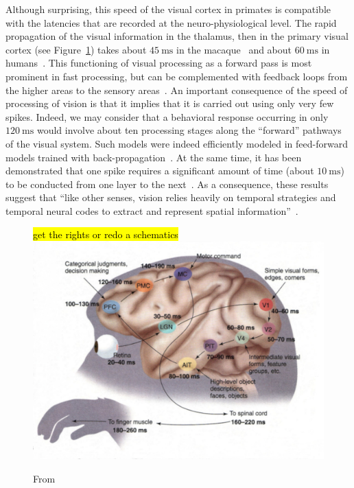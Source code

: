 \documentclass[brainsci, %
               review,submit,pdftex,moreauthors
               ]{Definitions/mdpi}
\newcommand{\ms}{\si{\milli\second}}%
\newcommand{\note}[1]{{\sethlcolor{yellow}\hl{#1}}}
\begin{document}
Although surprising, this speed of the visual cortex in primates is compatible with the latencies that are recorded at the neuro-physiological level. The rapid propagation of the visual information in the thalamus, then in the primary visual cortex (see Figure~\ref{fig:thorpe}) takes about $45~\ms$ in the macaque~\citep{schmolesky_signal_1998} and about $60~\ms$ in humans~\citep{vanni_coinciding_2001}. This functioning of visual processing as a forward pass is most prominent in fast processing, but can be complemented with feedback loops from the higher areas to the sensory areas~\citep{lamme_distinct_2000}. An important consequence of the speed of processing of vision is that it implies that it is carried out using only very few spikes. Indeed, we may consider that a behavioral response occurring in only $120~\ms$ would involve about ten processing stages along the ``forward'' pathways of the visual system. Such models were indeed efficiently modeled in feed-forward models trained with back-propagation~\citep{serre_feedforward_2007,jeremie_ultrafast_2022}. At the same time, it has been demonstrated that one spike requires a significant amount of time (about $10~\ms$) to be conducted from one layer to the next~\citep{nowak_timing_1997,thorpe_seeking_2001}. As a consequence, these results suggest that ``like other senses, vision relies heavily on temporal strategies and temporal neural codes to extract and represent spatial information''~\citep{rucci_temporal_2018}.
\begin{figure}
\centering
\note{get the rights or redo a schematics}
\includegraphics[width=.7\textwidth]{figures/visual-latency-estimate.jpg}
\caption{From~\citep{thorpe_seeking_2001} }\label{fig:thorpe}
\end{figure}
\end{document}
